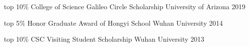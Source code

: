 
\begin{cvhonors}

	\cvhonor
		{top 10\%}%
		{College of Science Galileo Circle Scholarship}%
		{University of Arizona}%
		{2019}%


	\cvhonor
		{top 5\%}%
		{Honor Graduate Award of Hongyi School}%
		{Wuhan University}%
		{2014}%

	\cvhonor
		{top 10\%}%
		{CSC Visiting Student Scholarship}%
		{Wuhan University}%
		{2013}%
\end{cvhonors}